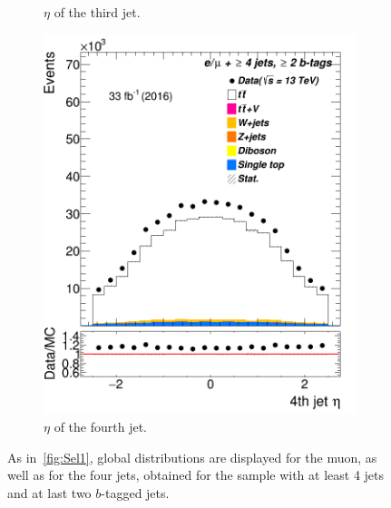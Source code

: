 \begin{figure}
\begin{subfigure}{0.25\textwidth}
	\caption{$\eta$ of the third jet.} \label{fig:Sec25}
\end{subfigure}

\begin{subfigure}{0.25\textwidth}
	\includegraphics[width=\linewidth]{ControlPlots_emujets_2016_4incl_2incl/jet3_eta_emujets_2016.png}
	\caption{$\eta$ of the fourth jet.} \label{fig:Sec29}
\end{subfigure}



	
	\caption{As in~\cref{fig:Sel1}, global distributions are displayed for the muon, as well as for the four jets, obtained for the sample with at least 4 jets and at last two $b$-tagged jets.}	\label{fig:Sel2}
\end{figure}













